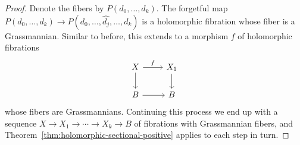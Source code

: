 \documentclass[10pt,a4paper]{amsart}
\theoremstyle{definition}
\begin{document}
\begin{proof}
Denote the fibers by $P(d_{0}, \ldots, d_{k})$.
The forgetful map $P(d_{0}, \ldots, d_{k}) \to P(d_{0}, \ldots, \hat{d_{j}}, \ldots, d_{k})$ is a holomorphic fibration whose fiber is a Grassmannian.
Similar to before, this extends to a morphism $f$ of holomorphic fibrations
\[
\begin{tikzcd}
  X \ar[r,"f"]\ar[d] & X_{1} \ar[d]
  \\
  B \ar[r] & B
\end{tikzcd}
\]
whose fibers are Grassmannians.
Continuing this process we end up with a sequence $X \to X_{1} \to \cdots \to X_{k} \to B$ of fibrations with Grassmannian fibers, and Theorem~\ref{thm:holomorphic-sectional-positive} applies to each step in turn.
\end{proof}












\end{document}
